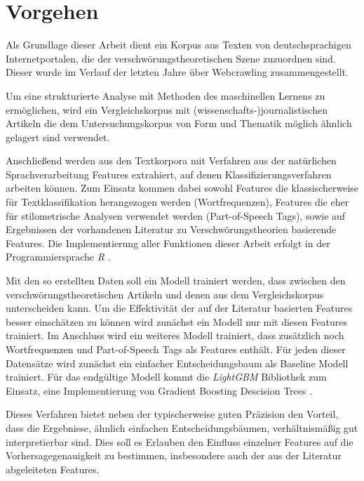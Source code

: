 \section{Vorgehen}

Als Grundlage dieser Arbeit dient ein Korpus aus Texten von deutschsprachigen Internetportalen, die der verschwörungstheoretischen Szene zuzuordnen sind.
Dieser wurde im Verlauf der letzten Jahre über Webcrawling zusammengestellt.

Um eine strukturierte Analyse mit Methoden des maschinellen Lernens zu ermöglichen, wird ein Vergleichskorpus mit (wissenschafts-)journalistischen Artikeln die dem Untersuchungskorpus von Form und Thematik möglich ähnlich gelagert sind verwendet.

Anschließend werden aus den Textkorpora mit Verfahren aus der natürlichen Sprachverarbeitung Features extrahiert, auf denen Klassifizierungsverfahren arbeiten können.
Zum Einsatz kommen dabei sowohl Features die klassischerweise für Textklassifikation herangezogen werden (Wortfrequenzen), Features die eher für stilometrische Analysen verwendet werden (Part-of-Speech Tags), sowie auf Ergebnissen der vorhandenen Literatur zu Verschwörungstheorien basierende Features.
Die Implementierung aller Funktionen dieser Arbeit erfolgt in der Programmiersprache \textit{R} \parencite{r_2021}.

Mit den so erstellten Daten soll ein Modell trainiert werden, dass zwischen den verschwörungstheoretischen Artikeln und denen aus dem Vergleichskorpus unterscheiden kann.
Um die Effektivität der auf der Literatur basierten Features besser einschätzen zu können wird zunächst ein Modell nur mit diesen Features trainiert.
Im Anschluss wird ein weiteres Modell trainiert, dass zusätzlich noch Wortfrequenzen und Part-of-Speech Tags als Features enthält.
Für jeden dieser Datensätze wird zunächst ein einfacher Entscheidungsbaum als Baseline Modell trainiert.
Für das endgültige Modell kommt die \textit{LightGBM} Bibliothek \parencite[][]{lightgbm} zum Einsatz, eine Implementierung von Gradient Boosting Descision Trees \parencite{friedman_2002}.

Dieses Verfahren bietet neben der typischerweise guten Präzision den Vorteil, dass die Ergebnisse, ähnlich einfachen Entscheidungsbäumen, verhältnismäßig gut interpretierbar sind.
Dies soll es Erlauben den Einfluss einzelner Features auf die Vorhersagegenauigkeit zu bestimmen, insbesondere auch der aus der Literatur abgeleiteten Features.